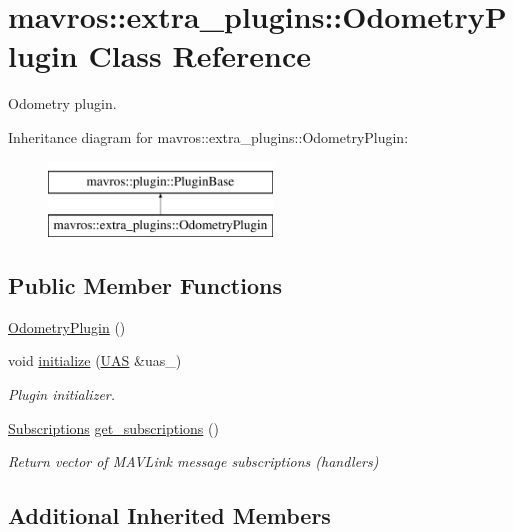 \hypertarget{classmavros_1_1extra__plugins_1_1OdometryPlugin}{}\section{mavros\+::extra\+\_\+plugins\+::Odometry\+Plugin Class Reference}
\label{classmavros_1_1extra__plugins_1_1OdometryPlugin}


Odometry plugin.  


Inheritance diagram for mavros\+::extra\+\_\+plugins\+::Odometry\+Plugin\+:\begin{figure}[H]
\begin{center}
\leavevmode
\includegraphics[height=2.000000cm]{classmavros_1_1extra__plugins_1_1OdometryPlugin}
\end{center}
\end{figure}
\subsection*{Public Member Functions}
\begin{DoxyCompactItemize}
\item 
\mbox{\hyperlink{group__plugin_gaa5846c0b3650b8c78b7645ef11425752}{Odometry\+Plugin}} ()
\item 
void \mbox{\hyperlink{group__plugin_gafc4d5bae52e8335f3fd027ef6c664c5a}{initialize}} (\mbox{\hyperlink{classmavros_1_1UAS}{U\+AS}} \&uas\+\_\+)
\begin{DoxyCompactList}\small\item\em Plugin initializer. \end{DoxyCompactList}\item 
\mbox{\hyperlink{group__plugin_ga8967d61fc77040e0c3ea5a4585d62a09}{Subscriptions}} \mbox{\hyperlink{group__plugin_ga67f0c200b8288b38f454aadd9ea68710}{get\+\_\+subscriptions}} ()
\begin{DoxyCompactList}\small\item\em Return vector of M\+A\+V\+Link message subscriptions (handlers) \end{DoxyCompactList}\end{DoxyCompactItemize}
\subsection*{Additional Inherited Members}


